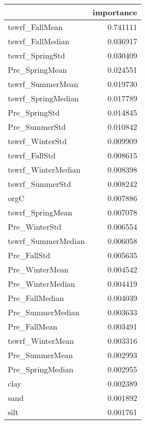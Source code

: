 \begin{tabular}{lr}
\toprule
 & importance \\
\midrule
tswrf_FallMean & 0.741111 \\
tswrf_FallMedian & 0.036917 \\
tswrf_SpringStd & 0.030409 \\
Pre_SpringMean & 0.024551 \\
tswrf_SummerMean & 0.019730 \\
tswrf_SpringMedian & 0.017789 \\
Pre_SpringStd & 0.014845 \\
Pre_SummerStd & 0.010842 \\
tswrf_WinterStd & 0.009909 \\
tswrf_FallStd & 0.008615 \\
tswrf_WinterMedian & 0.008398 \\
tswrf_SummerStd & 0.008242 \\
orgC & 0.007886 \\
tswrf_SpringMean & 0.007078 \\
Pre_WinterStd & 0.006554 \\
tswrf_SummerMedian & 0.006058 \\
Pre_FallStd & 0.005635 \\
Pre_WinterMean & 0.004542 \\
Pre_WinterMedian & 0.004419 \\
Pre_FallMedian & 0.004039 \\
Pre_SummerMedian & 0.003633 \\
Pre_FallMean & 0.003491 \\
tswrf_WinterMean & 0.003316 \\
Pre_SummerMean & 0.002993 \\
Pre_SpringMedian & 0.002955 \\
clay & 0.002389 \\
sand & 0.001892 \\
silt & 0.001761 \\
\bottomrule
\end{tabular}
